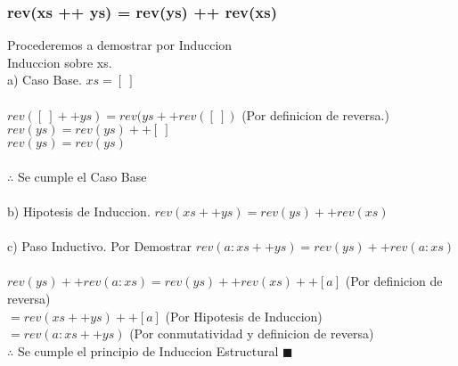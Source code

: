 \documentclass[11pt,letterpaper]{article}
\begin{document}
      \subsubsection{rev(xs ++ ys) = rev(ys) ++ rev(xs)}
         Procederemos a demostrar por Induccion\\
         Induccion sobre xs.\\
         a) Caso Base. $xs = [\ ]$\\ \\
         $rev ([\ ] + + ys) = rev(ys + + rev([\ ])$  \hspace{1cm} (Por definicion de reversa.) \\
         $rev(ys) = rev(ys) + + [\ ]$\\
         $rev(ys) = rev(ys)$\\ \\
         $\therefore$ Se cumple el Caso Base \\ \\
         b) Hipotesis de Induccion. $ rev(xs ++ ys) = rev(ys) + + rev(xs)$\\ \\
         c) Paso Inductivo. Por Demostrar $rev(a:xs ++ ys) = rev(ys) + + rev(a:xs)$ \\ \\
         $rev(ys) + + rev(a:xs) = rev(ys) ++ rev(xs) + + [a]$ \hspace{2cm} (Por definicion de reversa)\\
         $ = rev(xs + + ys) + + [a]$ \hspace{7cm} (Por Hipotesis de Induccion)\\
         $ = rev(a:xs + + ys)$ \hspace{7cm} (Por conmutatividad y definicion de reversa)\\
         $\therefore$ Se cumple el principio de Induccion Estructural $ \blacksquare$
\end{document}
